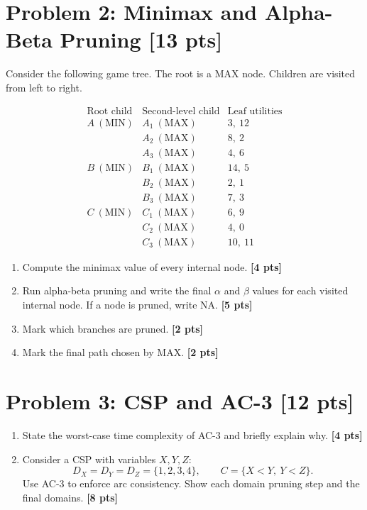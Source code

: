 \documentclass[UTF8,11pt,a4paper]{ctexart}
\newcommand{\pts}[1]{\hfill{\bfseries [#1 pts]}}
\begin{document}
\section*{Problem 2: Minimax and Alpha-Beta Pruning \pts{13}}

Consider the following game tree. The root is a MAX node. Children are visited from left to right.

\[
\begin{array}{c|c|c}
\text{Root child} & \text{Second-level child} & \text{Leaf utilities}\\
\hline
A\ (\text{MIN}) & A_1\ (\text{MAX}) & 3,\ 12\\
                & A_2\ (\text{MAX}) & 8,\ 2\\
                & A_3\ (\text{MAX}) & 4,\ 6\\
\hline
B\ (\text{MIN}) & B_1\ (\text{MAX}) & 14,\ 5\\
                & B_2\ (\text{MAX}) & 2,\ 1\\
                & B_3\ (\text{MAX}) & 7,\ 3\\
\hline
C\ (\text{MIN}) & C_1\ (\text{MAX}) & 6,\ 9\\
                & C_2\ (\text{MAX}) & 4,\ 0\\
                & C_3\ (\text{MAX}) & 10,\ 11
\end{array}
\]

\begin{enumerate}[label=(\alph*)]
\item Compute the minimax value of every internal node. \pts{4}
\item Run alpha-beta pruning and write the final $\alpha$ and $\beta$ values for each visited internal node. If a node is pruned, write NA. \pts{5}
\item Mark which branches are pruned. \pts{2}
\item Mark the final path chosen by MAX. \pts{2}
\end{enumerate}

\section*{Problem 3: CSP and AC-3 \pts{12}}

\begin{enumerate}[label=(\alph*)]
\item State the worst-case time complexity of AC-3 and briefly explain why. \pts{4}
\item Consider a CSP with variables $X,Y,Z$:
\[
D_X=D_Y=D_Z=\{1,2,3,4\},\qquad C=\{X<Y,\ Y<Z\}.
\]
Use AC-3 to enforce arc consistency. Show each domain pruning step and the final domains. \pts{8}
\end{enumerate}
\end{document}
